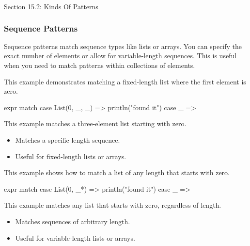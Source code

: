 \begin{notes}{Section 15.2: Kinds Of Patterns}
\begin{highlight}
    \end{highlight}
    
    \subsubsection*{Sequence Patterns}
    
    Sequence patterns match sequence types like lists or arrays. You can specify the exact number of elements or allow for variable-length sequences. This is useful when you need to match patterns 
    within collections of elements.
    
    \begin{highlight}
    
    This example demonstrates matching a fixed-length list where the first element is zero.
    
    \begin{code}[Scala]
    expr match {
        case List(0, _, _) => println("found it")
        case _ =>
    }
    \end{code}
    
    This example matches a three-element list starting with zero.
    
    \begin{itemize}
        \item Matches a specific length sequence.
        \item Useful for fixed-length lists or arrays.
    \end{itemize}
    
    \end{highlight}
    
    \begin{highlight}
    
    This example shows how to match a list of any length that starts with zero.
    
    \begin{code}[Scala]
    expr match {
        case List(0, _*) => println("found it")
        case _ =>
    }
    \end{code}
    
    This example matches any list that starts with zero, regardless of length.
    
    \begin{itemize}
        \item Matches sequences of arbitrary length.
        \item Useful for variable-length lists or arrays.
    \end{itemize}
    

\end{highlight}
\end{notes}
